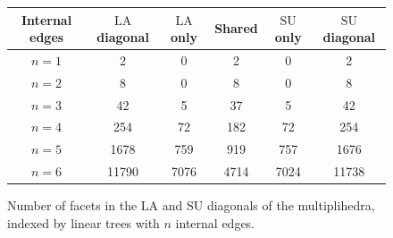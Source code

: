 \documentclass{amsart}
\theoremstyle{definition}
\newcommand{\SU}{\mathrm{SU}}
\newcommand{\LA}{\mathrm{LA}}
\begin{document}
\begin{figure}
	\begin{center}
	\begin{tabular}{c|c|c|c|c|c} 
	Internal edges & $\LA$ diagonal & $\LA$ only & Shared & $\SU$ only & $\SU$ diagonal \\
	\hline
	$n=1$ & 2 & 0 & 2 & 0 & 2 \\
	$n=2$ & 8 & 0 & 8 & 0 & 8 \\
	$n=3$ & 42 & 5 & 37 & 5 & 42 \\
	$n=4$ & 254 & 72 & 182 & 72 & 254 \\
	$n=5$ & 1678 & 759 & 919 & 757 & 1676 \\
	$n=6$ & 11790 & 7076 & 4714 & 7024 & 11738 
	\end{tabular}
	\end{center}
	\caption{Number of facets in the $\LA$ and $\SU$ diagonals of the multiplihedra, indexed by linear trees with $n$ internal edges.}
	\label{table:multiplihedra}
\end{figure}


\clearpage


\label{sec:biblio}
\end{document}
